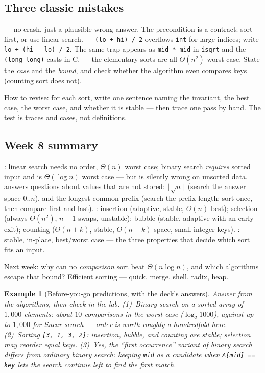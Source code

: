 \documentclass[11pt]{article}
\newtheorem{example}{Example}[section]
\begin{document}
\subsection{Three classic mistakes}

 --- no crash, just a plausible wrong answer. The precondition is a contract: sort first, or use linear search.  --- \texttt{(lo + hi) / 2} overflows \texttt{int} for large indices; write \texttt{lo + (hi - lo) / 2}. The same trap appears            as \texttt{mid * mid} in \texttt{isqrt} and the \texttt{(long long)} casts in C.  --- the elementary sorts are all $\Theta(n^2)$ worst case. State the \emph{case} and the \emph{bound}, and check whether the algorithm even compares keys (counting sort does not).

How to revise: for each sort, write one sentence naming the invariant, the best case, the worst case, and whether it is stable --- then trace one pass by hand. The test is traces and cases, not definitions.

\subsection{Week 8 summary}

: linear search needs no order, $\Theta(n)$ worst case; binary search \emph{requires} sorted input and is $\Theta(\log n)$ worst case --- but is silently wrong on unsorted data.  answers questions about values that are not stored: $\lfloor \sqrt{n} \rfloor$ (search the answer space $0..n$), and the longest common prefix (search the prefix length; sort once, then compare first and last). : insertion (adaptive, stable, $O(n)$ best); selection (always $\Theta(n^2)$, $n-1$ swaps, unstable); bubble (stable, adaptive with an early exit); counting ($\Theta(n+k)$, stable, $O(n+k)$ space, small integer keys). : stable, in-place, best/worst case --- the three properties that decide which sort fits an input.

Next week: why can no \emph{comparison} sort beat $\Theta(n \log n)$, and which algorithms escape that bound? Efficient sorting --- quick, merge, shell, radix, heap.

\begin{example}[Before-you-go predictions, with the deck's answers]
Answer from the algorithms, then check in the lab. (1)~Binary search on a sorted array of $1{,}000$ elements: about $10$ comparisons in the worst case ($\log_2 1000$), against up to $1{,}000$ for linear search --- order is worth roughly a hundredfold here. (2)~Sorting \texttt{[3, 1, 3, 2]}: insertion, bubble, and counting are stable; selection may reorder equal keys. (3)~Yes, the ``first occurrence'' variant of binary search differs from ordinary binary search: keeping \texttt{mid} as a candidate when \texttt{A[mid] == key} lets the search continue left to find the \emph{first} match.
\end{example}
\end{document}
